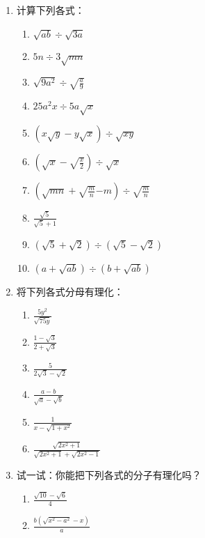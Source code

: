 \begin{ex}
\begin{enumerate}
    \item 计算下列各式：
\begin{multicols}{2}
\begin{enumerate}
    \item $\sqrt{ab}\div \sqrt{3a}$
    \item $5n\div 3\sqrt{mn}$
\item $\sqrt{9a^2}\div \sqrt{\frac{a}{9}}$
\item $25a^2x\div 5a\sqrt{x}$
\item  $\left(x\sqrt{y}-y\sqrt{x}\right)\div \sqrt{xy}$
\item $\left(\sqrt{x}-\sqrt{\frac{x}{2}}\right)\div \sqrt{x}$
\item $\left(\sqrt{mn}+\sqrt{\frac{m}{n}}{-m}\right)\div \sqrt{\frac{m}{n}}$
\item $\frac{\sqrt{5}}{\sqrt{5}+1}$
\item $(\sqrt{5}+\sqrt{2})\div (\sqrt{5}-\sqrt{2})$
\item $(a+\sqrt{ab})\div (b+\sqrt{ab})$
\end{enumerate}    
\end{multicols}

    \item 将下列各式分母有理化：
    \begin{multicols}{2}
\begin{enumerate}
\item $\frac{5y^2}{\sqrt{75y}}$
\item $\frac{1-\sqrt{3}}{2+\sqrt{3}}$
\item $\frac{5}{2\sqrt{3}-\sqrt{2}}$
\item $\frac{a-b}{\sqrt{a}-\sqrt{b}}$
\item $\frac{1}{x-\sqrt{1+x^2}}$
\item $\frac{\sqrt{2x^2+1}}{\sqrt{2x^2+1}+\sqrt{2x^2-1}}$
\end{enumerate}    
\end{multicols}

    \item 试一试：你能把下列各式的分子有理化吗？
    \begin{multicols}{2}
        \begin{enumerate}
        \item  $\frac{\sqrt{10}-\sqrt{6}}{4}$
        \item $\frac{b(\sqrt{x^2-a^2}-x)}{a}$
        \end{enumerate}    
        \end{multicols}
\end{enumerate}    
\end{ex}

